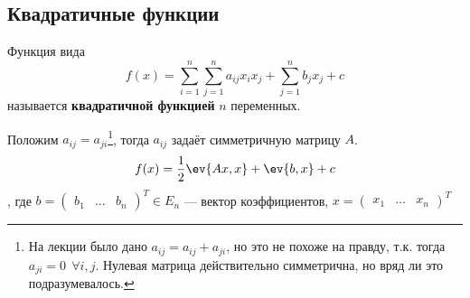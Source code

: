 \subsection{Квадратичные функции}

\begin{definition}
    Функция вида
    \begin{equation}
        f(x) = \sum_{i = 1}^n \sum_{j = 1}^n a_{ij} x_i x_j + \sum_{j = 1}^n b_j x_j + c \label{квадратичная функция}
    \end{equation}
    называется \textbf{квадратичной функцией} \(n\) переменных.
\end{definition}

Положим \(a_{ij} = a_{ji}\)\footnote{На лекции было дано \(a_{ij} = a_{ij} + a_{ji}\), но это не похоже на правду, т.к. тогда \(a_{ji} = 0 \ \ \forall i, j\). Нулевая матрица действительно симметрична, но вряд ли это подразумевалось.}, тогда \(a_{ij}\) задаёт симметричную матрицу \(A\).
\begin{equation}
    f(x) = \frac{1}{2} \ev{Ax, x} + \ev{b, x} + c \label{квадратичная функция с симметричной матрицей}
\end{equation}
, где \(b = \begin{pmatrix} b_1 & \dots & b_n \end{pmatrix}^T \in E_n\) --- вектор коэффициентов, \(x = \begin{pmatrix} x_1 & \dots & x_n \end{pmatrix}^T\)


